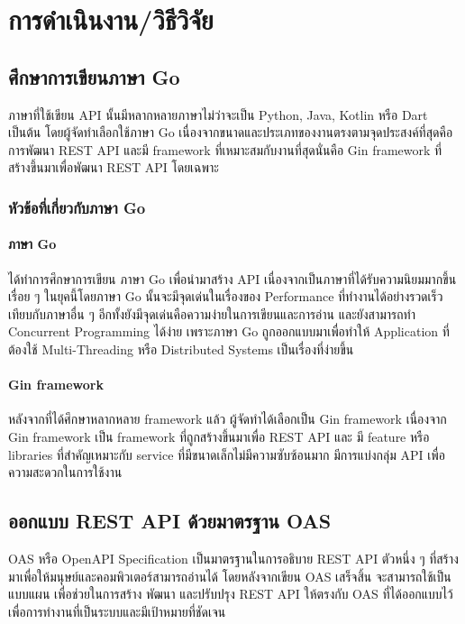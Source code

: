 \chapter{การดําเนินงาน/วิธีวิจัย}
\label{chapter3}

\section{ศึกษาการเขียนภาษา Go}
    ภาษาที่ใช้เขียน API นั้นมีหลากหลายภาษาไม่ว่าจะเป็น Python, Java, Kotlin หรือ Dart เป็นต้น โดยผู้จัดทำเลือกใช้ภาษา Go เนื่องจากขนาดและประเภทของงานตรงตามจุดประสงค์ที่สุดคือ การพัฒนา REST API และมี framework ที่เหมาะสมกับงานที่สุดนั่นคือ Gin framework ที่สร้างขึ้นมาเพื่อพัฒนา REST API โดยเฉพาะ

\subsection{หัวข้อที่เกี่ยวกับภาษา Go}

\subsubsection{ภาษา Go}
    ได้ทำการศึกษาการเขียน ภาษา Go\cite{Go} เพื่อนำมาสร้าง API เนื่องจากเป็นภาษาที่ได้รับความนิยมมากขึ้นเรื่อย ๆ ในยุคนี้โดยภาษา Go นั้นจะมีจุดเด่นในเรื่องของ Performance ที่\mbox{ทำงาน}ได้อย่างรวดเร็วเทียบกับภาษาอื่น ๆ อีกทั้งยังมีจุดเด่นคือความง่ายในการเขียนและการอ่าน และยัง\mbox{สามารถ}ทำ Concurrent Programming ได้ง่าย เพราะภาษา Go ถูกออกแบบมาเพื่อทำให้ Application ที่ต้องใช้ Multi-Threading หรือ Distributed Systems เป็นเรื่องที่ง่ายขึ้น
\subsubsection{Gin framework}
    หลังจากที่ได้ศึกษาหลากหลาย framework แล้ว ผู้จัดทำได้เลือกเป็น Gin framework\cite{Gin} เนื่องจาก Gin framework เป็น framework ที่ถูกสร้างขึ้นมาเพื่อ REST API และ มี feature หรือ libraries ที่สําคัญเหมาะกับ service ที่มีขนาดเล็กไม่มีความซับซ้อนมาก มีการแบ่งกลุ่ม API เพื่อความสะดวกในการใช้งาน
    
\section{ออกแบบ REST API ด้วยมาตรฐาน OAS}
OAS หรือ OpenAPI Specification เป็นมาตรฐานในการอธิบาย REST API ตัวหนึ่ง ๆ ที่สร้างมาเพื่อให้มนุษย์และคอมพิวเตอร์สามารถอ่านได้ โดยหลังจากเขียน OAS เสร็จสิ้น จะสามารถใช้เป็นแบบแผน เพื่อช่วยในการสร้าง พัฒนา และปรับปรุง REST API ให้ตรงกับ OAS ที่ได้ออกแบบไว้เพื่อการทํางานที่เป็นระบบและมีเป้าหมายที่ชัดเจน

